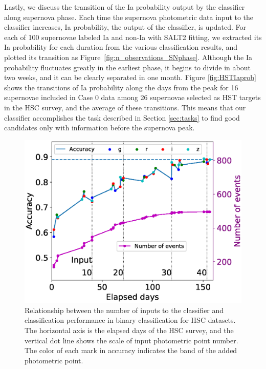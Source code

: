 \documentclass[useamsfonts]{pasj01}
\begin{document}
Lastly, we discuss the transition of the Ia probability output by the classifier along supernova phase.
Each time the supernova photometric data input to the classifier increases, Ia probability, the output of the classifier, is updated.
For each of 100 supernovae labeled Ia and non-Ia with SALT2 fitting, we extracted its Ia probability for each duration from the various classification results, and plotted its transition as Figure\ \ref{fig:n_observations_SNphase}.
Although the Ia probability fluctuates greatly in the earliest phase, it begins to divide in about two weeks, and it can be clearly separated in one month.
Figure \ref{fig:HSTIaprob} shows the transitions of Ia probability along the days from the peak for 16 supernovae included in Case 0 data among 26 supernovae selected as HST targets in the HSC survey, and the average of these transitions.
This means that our classifier accomplishes the task described in Section \ref{sec:tasks} to find good candidates only with information before the supernova peak.
%
\begin{figure}[ht]
  \begin{center}
     \includegraphics[width=\columnwidth]{figures/n_observations_v2.eps}
  \end{center}
  \caption{%
  Relationship between the number of inputs to the classifier and classification performance in binary classification for HSC datasets. 
  The horizontal axis is the elapsed days of the HSC survey, and the vertical dot line shows the scale of input photometric point number. 
  The color of each mark in accuracy indicates the band of the added photometric point.
  }%
  \label{fig:n_observations}
\end{figure}
\end{document}
